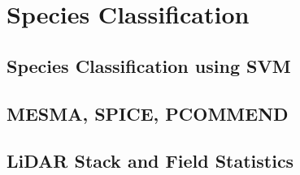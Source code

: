 \chapter{Species Classification}

\section{Species Classification using SVM}

\section{MESMA, SPICE, PCOMMEND}

\section{LiDAR Stack and Field Statistics}